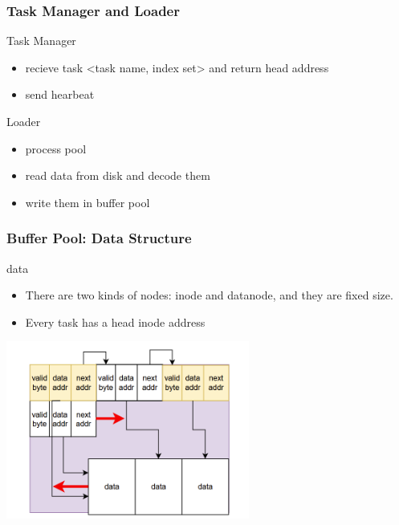\documentclass[notheorems, aspectratio=54]{beamer}
\begin{document}
\begin{frame}
    \frametitle{Task Manager and Loader}
    \begin{block}{Task Manager}
        \begin{itemize}
            \item recieve task <task name, index set> and return head address
            \item send hearbeat
        \end{itemize}
    \end{block}
    \begin{block}{Loader}
        \begin{itemize}
            \item process pool
            \item read data from disk and decode them 
            \item write them in buffer pool
        \end{itemize}
    \end{block}
\end{frame}


\begin{frame}
    \frametitle{Buffer Pool: Data Structure}
    \begin{block} {data}
        \begin{itemize}
            \item There are two kinds of nodes: inode and datanode, and they are fixed size.
            \item Every task has a head inode address
        \end{itemize}
    \end{block}
    \centering
    \includegraphics[width=8cm]{global_img_dir/linklist.png}
\end{frame}
\end{document}
